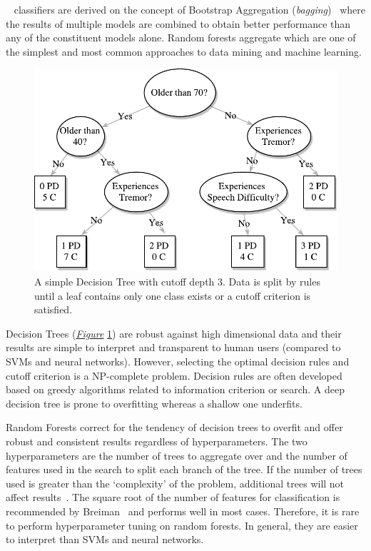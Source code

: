 \documentclass[12pt, twoside]{book}
\renewcommand\emph[1]{\textit{\color{USred}{#1}}}
\begin{document}
\emph{Random Forest}~\cite{randomforests} classifiers are derived on the concept of Bootstrap Aggregation  (\textit{bagging})~\cite{bagging} where the results of multiple models are combined to obtain better performance than any of the constituent models alone. Random forests aggregate \emph{Decision Trees} which are one of the simplest and most common approaches to data mining and machine learning.

\begin{figure}[!htb]
\centering\includegraphics[width=0.7\linewidth]{decisiontree.pdf}
\caption{A simple Decision Tree with cutoff depth 3. Data is split by rules until a leaf contains only one class exists or a cutoff criterion is satisfied.}
\label{decisiontree}
\end{figure}

Decision Trees (\textit{\hyperref[decisiontree]{Figure}} \ref{decisiontree}) are robust against high dimensional data and their results are simple to interpret and transparent to human users (compared to SVMs and neural networks). However, selecting the optimal decision rules and cutoff criterion is a NP-complete problem. Decision rules are often developed based on greedy algorithms related to information criterion or search. A deep decision tree is prone to overfitting whereas a shallow one underfits.

Random Forests correct for the tendency of decision trees to overfit and offer robust and consistent results regardless of hyperparameters. The two hyperparameters are the number of trees to aggregate over and the number of features used in the search to split each branch of the tree. If the number of trees used is greater than the `complexity' of the problem, additional trees will not affect results~\cite{treesinaforest}. The square root of the number of features for classification is recommended by Breiman~\cite{randomforests} and performs well in most cases. Therefore, it is rare to perform hyperparameter tuning on random forests. In general, they are easier to interpret than SVMs and neural networks.
\end{document}
